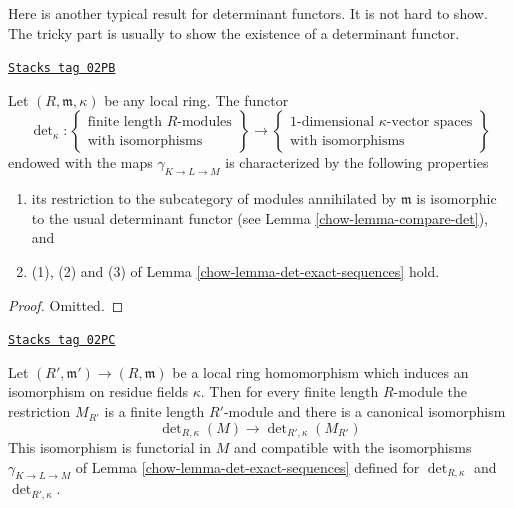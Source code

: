 \medskip\noindent
Here is another typical result for determinant functors.
It is not hard to show. The tricky part is usually to show the
existence of a determinant functor.

\begin{lemma}
\label{chow-lemma-uniqueness-det}
\href{https://stacks.math.columbia.edu/tag/02PB}{\texttt{Stacks tag 02PB}}

Let $(R, \mathfrak m, \kappa)$ be any local ring.
The functor
$$
\det\nolimits_\kappa :
\left\{
\begin{matrix}
\text{finite length }R\text{-modules} \\
\text{with isomorphisms}
\end{matrix}
\right\}
\longrightarrow
\left\{
\begin{matrix}
1\text{-dimensional }\kappa\text{-vector spaces} \\
\text{with isomorphisms}
\end{matrix}
\right\}
$$
endowed with the maps $\gamma_{K \to L \to M}$ is characterized by
the following properties
\begin{enumerate}
\item its restriction to the subcategory of modules annihilated
by $\mathfrak m$ is isomorphic to the usual determinant functor
(see Lemma \ref{chow-lemma-compare-det}), and
\item (1), (2) and (3) of Lemma \ref{chow-lemma-det-exact-sequences}
hold.
\end{enumerate}
\end{lemma}

\begin{proof}
Omitted.
\end{proof}

\begin{lemma}
\label{chow-lemma-determinant-quotient-ring}
\href{https://stacks.math.columbia.edu/tag/02PC}{\texttt{Stacks tag 02PC}}

Let $(R', \mathfrak m') \to (R, \mathfrak m)$ be a local ring
homomorphism which induces an isomorphism on residue fields $\kappa$.
Then for every finite length $R$-module the restriction $M_{R'}$
is a finite length $R'$-module and there is a canonical isomorphism
$$
\det\nolimits_{R, \kappa}(M)
\longrightarrow
\det\nolimits_{R', \kappa}(M_{R'})
$$
This isomorphism is functorial in $M$ and compatible with the
isomorphisms $\gamma_{K \to L \to M}$ of Lemma \ref{chow-lemma-det-exact-sequences}
defined for $\det_{R, \kappa}$ and $\det_{R', \kappa}$.
\end{lemma}


